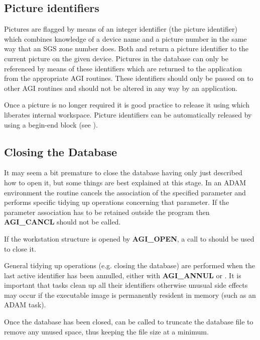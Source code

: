 \documentclass[twoside,11pt]{starlink}
\begin{document}
\subsection{Picture identifiers}

Pictures are flagged by means of an integer identifier (the picture
identifier) which combines knowledge of a device name and a picture
number in the same way that an SGS zone number does. Both
and
return a picture identifier to the current picture on
the given device. Pictures in the database can only be referenced by means
of these identifiers which are returned to the application from the
appropriate AGI routines. These identifiers should only be passed on to
other AGI routines and should not be altered in any way by an application.

Once a picture is no longer required it is good practice to release it using
 which liberates internal workspace. Picture identifiers
can be automatically released by using a begin-end block (see
).

\subsection{Closing the Database}

It may seem a bit premature to close the database having only just
described how to open it, but some things are best explained at this stage.
In an ADAM environment the routine
 cancels the
association of the specified parameter and performs specific tidying
up operations concerning that parameter. If the parameter association
has to be retained outside the program then {\bf AGI\_CANCL} should not
be called.

If the workstation structure is opened by {\bf AGI\_OPEN}, a call to
 should be used to close it.

General tidying up operations (e.g. closing the database) are performed
when the last active identifier has been annulled, either with
{\bf AGI\_ANNUL} or
. It is important that tasks clean
up all their identifiers otherwise unusual side effects may occur if
the executable image is permanently resident in memory (such as an
ADAM task).

Once the database has been closed,  can
be called to truncate the database file to remove any unused space, thus
keeping the file size at a minimum.
\end{document}
